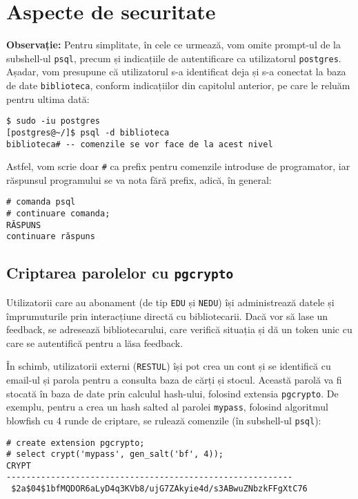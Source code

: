 \chapter{Aspecte de securitate}

\textbf{Observație:} Pentru simplitate, în cele ce urmează, vom omite
prompt-ul de la subshell-ul \texttt{psql}, precum și indicațiile de
autentificare ca utilizatorul \texttt{postgres}. Așadar, vom presupune
că utilizatorul s-a identificat deja și s-a conectat la baza de date
\texttt{biblioteca}, conform indicațiilor din capitolul anterior,
pe care le reluăm pentru ultima dată:

{
  \small
\begin{verbatim}
$ sudo -iu postgres
[postgres@~/]$ psql -d biblioteca
biblioteca# -- comenzile se vor face de la acest nivel
\end{verbatim}
}

Astfel, vom scrie doar \texttt{\#} ca prefix pentru comenzile
introduse de programator, iar răspunsul programului se va nota fără
prefix, adică, în general:
{
  \small
\begin{verbatim}
# comanda psql
# continuare comanda;
RĂSPUNS
continuare răspuns
\end{verbatim}
}

\section{Criptarea parolelor cu \texttt{pgcrypto}}

Utilizatorii care au abonament (de tip \texttt{EDU} și \texttt{NEDU}) își
administrează datele și împrumuturile prin in\-ter\-ac\-ți\-u\-ne directă cu
bibliotecarii. Dacă vor să lase un feedback, se adresează bibliotecarului,
care verifică situația și dă un token unic cu care se autentifică pentru
a lăsa feedback.

În schimb, utilizatorii externi (\texttt{RESTUL}) își pot crea un cont
și se identifică cu email-ul și parola pentru a consulta baza de cărți
și stocul. Această parolă va fi stocată în baza de date prin calculul
hash-ului, folosind extensia \texttt{pgcrypto}. De exemplu, pentru a crea
un hash salted al parolei \texttt{mypass}, folosind algoritmul blowfish
cu 4 runde de criptare, se rulează comenzile (în subshell-ul \texttt{psql}):

{
  \small
\begin{verbatim}
# create extension pgcrypto;
# select crypt('mypass', gen_salt('bf', 4));
CRYPT
----------------------------------------------------------
 $2a$04$1bfMQDOR6aLyD4q3KVb8/ujG7ZAkyie4d/s3ABwuZNbzkFFgXtC76
\end{verbatim}
}

